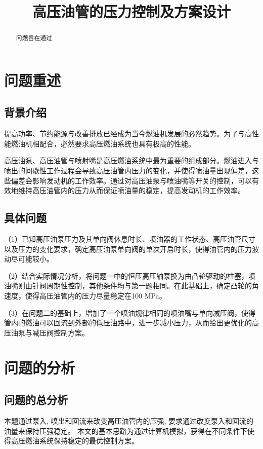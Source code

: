 \documentclass{cumcmthesis}
\title{高压油管的压力控制及方案设计}
\begin{document}
 \maketitle
 \begin{abstract}
问题旨在通过


\end{abstract}

\tableofcontents

\newpage

\section{问题重述}
\subsection{背景介绍}
提高功率、节约能源与改善排放已经成为当今燃油机发展的必然趋势。为了与高性能燃油机相配合，必然要求高压燃油系统也具有极高的性能。

高压油泵、高压油管与喷射嘴是高压燃油系统中最为重要的组成部分。燃油进入与喷出的间歇性工作过程会导致高压油管内压力的变化，并使得喷油量出现偏差，这些偏差会影响发动机的工作效率。通过对高压油泵与喷油嘴等开关的控制，可以有效地维持高压油管内的压力从而保证喷油量的稳定，提高发动机的工作效率。

\subsection{具体问题}

（1）已知高压油泵压力及其单向阀休息时长、喷油器的工作状态、高压油管尺寸以及压力的变化要求，确定高压油泵单向阀的单次开启时长，使得油管内的压力波动尽可能较小。

（2）结合实际情况分析，将问题一中的恒压高压轴泵换为由凸轮驱动的柱塞，喷油嘴则由针阀周期性控制，其他条件均与第一题相同。在此基础上，确定凸轮的角速度，使得高压油管内的压力尽量稳定在100 MPa。

（3）在问题二的基础上，增加了一个喷油规律相同的喷油嘴与单向减压阀，使得管内的燃油可以回流到外部的低压油路中，进一步减小压力，从而给出更优化的高压油泵与减压阀控制方案。

\section{问题的分析}
\subsection{问题的总分析}
本题通过泵入, 喷出和回流来改变高压油管内的压强, 要求通过改变泵入和回流的油量来保持压强稳定。
本文的基本思路为通过计算机模拟，获得在不同条件下使得高压燃油系统保持稳定的最优控制方案。
\end{document}
